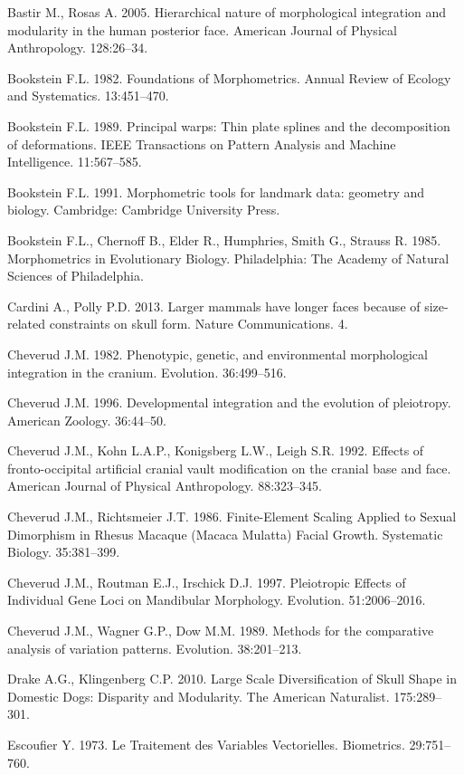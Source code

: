 \documentclass[12pt,]{article}
\begin{document}
Bastir M., Rosas A. 2005. Hierarchical nature of morphological
integration and modularity in the human posterior face. American Journal
of Physical Anthropology. 128:26--34.

Bookstein F.L. 1982. Foundations of Morphometrics. Annual Review of
Ecology and Systematics. 13:451--470.

Bookstein F.L. 1989. Principal warps: Thin plate splines and the
decomposition of deformations. IEEE Transactions on Pattern Analysis and
Machine Intelligence. 11:567--585.

Bookstein F.L. 1991. Morphometric tools for landmark data: geometry and
biology. Cambridge: Cambridge University Press.

Bookstein F.L., Chernoff B., Elder R., Humphries, Smith G., Strauss R.
1985. Morphometrics in Evolutionary Biology. Philadelphia: The Academy
of Natural Sciences of Philadelphia.

Cardini A., Polly P.D. 2013. Larger mammals have longer faces because of
size-related constraints on skull form. Nature Communications. 4.

Cheverud J.M. 1982. Phenotypic, genetic, and environmental morphological
integration in the cranium. Evolution. 36:499--516.

Cheverud J.M. 1996. Developmental integration and the evolution of
pleiotropy. American Zoology. 36:44--50.

Cheverud J.M., Kohn L.A.P., Konigsberg L.W., Leigh S.R. 1992. Effects of
fronto-occipital artificial cranial vault modification on the cranial
base and face. American Journal of Physical Anthropology. 88:323--345.

Cheverud J.M., Richtsmeier J.T. 1986. Finite-Element Scaling Applied to
Sexual Dimorphism in Rhesus Macaque (Macaca Mulatta) Facial Growth.
Systematic Biology. 35:381--399.

Cheverud J.M., Routman E.J., Irschick D.J. 1997. Pleiotropic Effects of
Individual Gene Loci on Mandibular Morphology. Evolution. 51:2006--2016.

Cheverud J.M., Wagner G.P., Dow M.M. 1989. Methods for the comparative
analysis of variation patterns. Evolution. 38:201--213.

Drake A.G., Klingenberg C.P. 2010. Large Scale Diversification of Skull
Shape in Domestic Dogs: Disparity and Modularity. The American
Naturalist. 175:289--301.

Escoufier Y. 1973. Le Traitement des Variables Vectorielles. Biometrics.
29:751--760.
\end{document}
